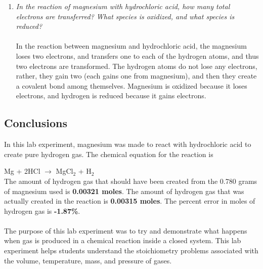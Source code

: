 \documentclass[11pt]{article}
\begin{document}
\begin{enumerate}
	\item \textit{In the reaction of magnesium with hydrochloric acid, how many total electrons are transferred? What 
species is oxidized, and what species is reduced?}\\ \\In the reaction between magnesium and hydrochloric acid, the magnesium loses two electrons, and transfers one to each of the hydrogen atoms, and thus two electrons are transformed. The hydrogen atoms do not lose any electrons, rather, they gain two (each gains one from magnesium), and then they create a covalent bond among themselves. Magnesium is oxidized because it loses electrons, and hydrogen is reduced because it gains electrons.              
\end{enumerate}
\subsection{Conclusions}
In this lab experiment, magnesium was made to react with hydrochloric acid to create pure hydrogen gas. The chemical equation for the reaction is

Mg + 2HCl $\rightarrow$ MgCl$_{2}$ + H$_{2}$ \\
The amount of hydrogen gas that should have been created from the 0.780 grams of magnesium used is \textbf{0.00321 moles}. The amount of hydrogen gas that was actually created in the reaction is \textbf{0.00315 moles}. The percent error in moles of hydrogen gas is \textbf{-1.87\%}. \\ \\ The purpose of this lab experiment was to try and demonstrate what happens when gas is produced in a chemical reaction inside a closed system. This lab experiment helps students understand the stoichiometry problems associated with the volume, temperature, mass, and pressure of gases.
\end{document}
